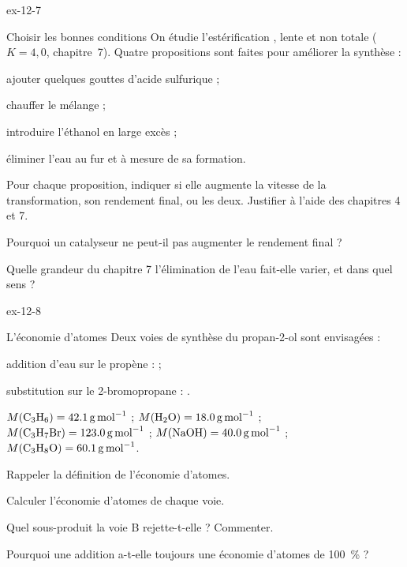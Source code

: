 \begin{blocLivre}{ex-12-7}
\begin{exercice}[2]{Choisir les bonnes conditions}
On étudie l'estérification , lente et non totale ($K=4{,}0$, chapitre~7).
Quatre propositions sont faites pour améliorer la synthèse :
\begin{questions}[label=\otLabel{\alph*.},leftmargin=1.9em,itemsep=0pt,parsep=0.15em]
\item ajouter quelques gouttes d'acide sulfurique ;
\item chauffer le mélange ;
\item introduire l'éthanol en large excès ;
\item éliminer l'eau au fur et à mesure de sa formation.
\end{questions}
\begin{questions}
\item Pour chaque proposition, indiquer si elle augmente la vitesse de la transformation, son rendement final, ou les
deux. Justifier à l'aide des chapitres 4 et 7.
\item Pourquoi un catalyseur ne peut-il pas augmenter le rendement final ?
\item Quelle grandeur du chapitre 7 l'élimination de l'eau fait-elle varier, et dans quel sens ?
\end{questions}
\end{exercice}
\end{blocLivre}
\begin{blocLivre}{ex-12-8}
\begin{exercice}[2]{L'économie d'atomes}
Deux voies de synthèse du propan-2-ol sont envisagées :
\begin{questions}[label=\otLabel{\Alph*.},leftmargin=1.9em,itemsep=0pt,parsep=0.15em]
\item addition d'eau sur le propène :  ;
\item substitution sur le 2-bromopropane : .
\end{questions}
\begin{donnees}
$M(\ce{C3H6})=\qty{42,1}{g.mol^{-1}}$ ; $M(\ce{H2O})=\qty{18,0}{g.mol^{-1}}$ ;
$M(\ce{C3H7Br})=\qty{123,0}{g.mol^{-1}}$ ; $M(\ce{NaOH})=\qty{40,0}{g.mol^{-1}}$ ;
$M(\ce{C3H8O})=\qty{60,1}{g.mol^{-1}}$.
\end{donnees}
\begin{questions}
\item Rappeler la définition de l'économie d'atomes.
\item Calculer l'économie d'atomes de chaque voie.
\item Quel sous-produit la voie B rejette-t-elle ? Commenter.
\item Pourquoi une addition a-t-elle toujours une économie d'atomes de 100~\% ?
\end{questions}
\end{exercice}
\end{blocLivre}
